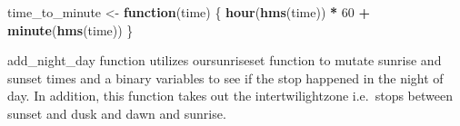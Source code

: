 \documentclass[
]{book}
\newenvironment{Shaded}{\begin{snugshade}}{\end{snugshade}}
\newcommand{\ControlFlowTok}[1]{\textcolor[rgb]{0.13,0.29,0.53}{\textbf{#1}}}
\newcommand{\DecValTok}[1]{\textcolor[rgb]{0.00,0.00,0.81}{#1}}
\newcommand{\KeywordTok}[1]{\textcolor[rgb]{0.13,0.29,0.53}{\textbf{#1}}}
\newcommand{\NormalTok}[1]{#1}
\newcommand{\OperatorTok}[1]{\textcolor[rgb]{0.81,0.36,0.00}{\textbf{#1}}}
\newcommand{\StringTok}[1]{\textcolor[rgb]{0.31,0.60,0.02}{#1}}
\begin{document}
\begin{Shaded}
\begin{Highlighting}[]
\NormalTok{time_to_minute <-}\StringTok{ }\ControlFlowTok{function}\NormalTok{(time) \{}
  \KeywordTok{hour}\NormalTok{(}\KeywordTok{hms}\NormalTok{(time)) }\OperatorTok{*}\StringTok{ }\DecValTok{60} \OperatorTok{+}\StringTok{ }\KeywordTok{minute}\NormalTok{(}\KeywordTok{hms}\NormalTok{(time))}
\NormalTok{\}}
\end{Highlighting}
\end{Shaded}

add\_night\_day function utilizes oursunriseset function to mutate sunrise and sunset times and a binary variables to see if the stop happened in the night of day. In addition, this function takes out the intertwilightzone i.e.~stops between sunset and dusk and dawn and sunrise.
\end{document}
